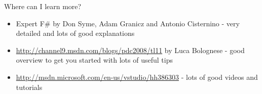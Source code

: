 \documentclass[landscape]{slides}
\begin{document}
\begin{slide}{Where can I learn more?}
\begin{itemize}
\item Expert F\# by Don Syme, Adam Granicz and Antonio Cisternino - very detailed and lots of good explanations
\item \href{http://channel9.msdn.com/blogs/pdc2008/tl11}{http://channel9.msdn.com/blogs/pdc2008/tl11} by Luca Bolognese - good overview to get you started with lots of useful tips
\item \href{http://msdn.microsoft.com/en-us/vstudio/hh386303}{http://msdn.microsoft.com/en-us/vstudio/hh386303} - lots of good videos and tutorials
\end{itemize}
\end{slide}
\end{document}
